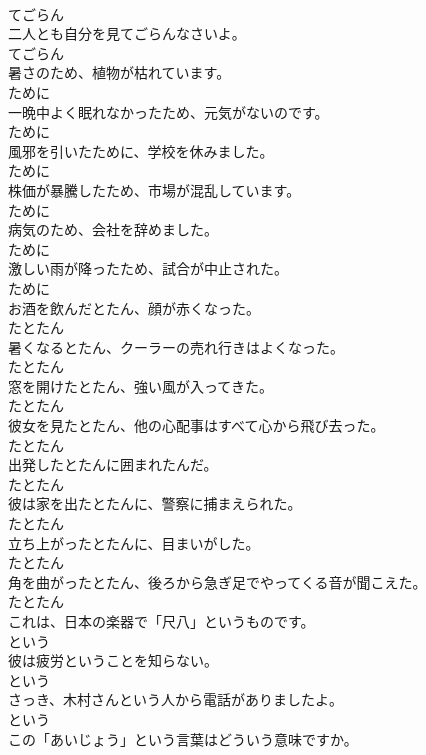 \documentclass[8pt]{extreport}
\begin{document}
\begin{CJK}{UTF8}{min}
\\	てごらん
\\	二人とも自分を見てごらんなさいよ。	
\\	てごらん
\\	暑さのため、植物が枯れています。	
\\	ために
\\	一晩中よく眠れなかったため、元気がないのです。	
\\	ために
\\	風邪を引いたために、学校を休みました。	
\\	ために
\\	株価が暴騰したため、市場が混乱しています。	
\\	ために
\\	病気のため、会社を辞めました。	
\\	ために
\\	激しい雨が降ったため、試合が中止された。	
\\	ために
\\	お酒を飲んだとたん、顔が赤くなった。	
\\	たとたん
\\	暑くなるとたん、クーラーの売れ行きはよくなった。	
\\	たとたん
\\	窓を開けたとたん、強い風が入ってきた。	
\\	たとたん
\\	彼女を見たとたん、他の心配事はすべて心から飛び去った。	
\\	たとたん
\\	出発したとたんに囲まれたんだ。	
\\	たとたん
\\	彼は家を出たとたんに、警察に捕まえられた。	
\\	たとたん
\\	立ち上がったとたんに、目まいがした。	
\\	たとたん
\\	角を曲がったとたん、後ろから急ぎ足でやってくる音が聞こえた。	
\\	たとたん
\\	これは、日本の楽器で「尺八」というものです。	
\\	という
\\	彼は疲労ということを知らない。	
\\	という
\\	さっき、木村さんという人から電話がありましたよ。	
\\	という
\\	この「あいじょう」という言葉はどういう意味ですか。	

\end{CJK}
\end{document}
